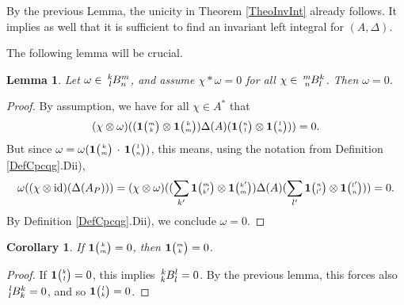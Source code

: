 \documentclass[11pt]{article}
\DeclareMathOperator{\id}{id}
\newcommand{\Grt}[3]{#1{\tiny {\begin{pmatrix} #2\\#3\end{pmatrix}}}}
\newcommand{\UnitC}[2]{\Grt{\mathbf{1}}{#1}{#2}}
\newcommand{\Gr}[5]{\,\tensor*[^{#2}_{#4}]{#1}{^{#3}_{#5}}}%
\newtheorem{Lem}[Theorem]{Lemma}
\newtheorem{Cor}[Theorem]{Corollary}
\theoremstyle{definition}
\numberwithin{equation}{section}
\begin{document}
By the previous Lemma, the unicity in Theorem \ref{TheoInvInt} already follows. It implies as well that it is sufficient to find an invariant left integral for $(A,\Delta)$.

The following lemma will be crucial.

\begin{Lem}\label{LemRefSep} Let $\omega \in \Gr{B}{k}{m}{l}{n}$, and assume $\chi*\omega =  0$ for all $\chi \in \Gr{B}{m}{k}{n}{l}$. Then $\omega =0$.
\end{Lem} 
\begin{proof} By assumption, we have for all $\chi\in A^*$ that \[(\chi\otimes \omega)((\UnitC{m}{k}\otimes \UnitC{k}{m})\Delta(A)(\UnitC{n}{l}\otimes \UnitC{l}{n}))=0.\] But since $\omega = \omega(\UnitC{k}{m}\,\cdot\,\UnitC{l}{n})$, this means, using the notation from Definition \ref{DefCpcqg}.Dii), \[\omega((\chi\otimes \id)(\Delta(A_P))) =(\chi\otimes \omega)((\sum_{k'}\UnitC{m}{k'}\otimes \UnitC{k'}{m})\Delta(A)(\sum_{l'}\UnitC{n}{l'}\otimes \UnitC{l'}{n})) =0.\] By Definition \ref{DefCpcqg}.Dii), we conclude $\omega=0$.
\end{proof} 

\begin{Cor} If $\UnitC{k}{m}=0$, then $\UnitC{m}{k}=0$. 
\end{Cor}
\begin{proof} If $\UnitC{k}{l}=0$, this implies $\Gr{B}{k}{l}{k}{l}=0$. By the previous lemma, this forces also $\Gr{B}{l}{k}{l}{k}=0$, and so $\UnitC{l}{k}=0$. 
\end{proof} 
\end{document}
